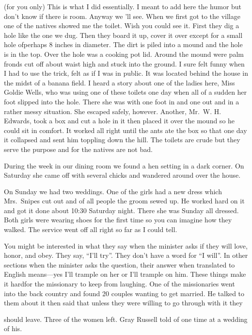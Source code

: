 \documentclass[
]{book}
\begin{document}
(for you only) This is what I did essentially. I meant to add here the humor but don't know if there is room. Anyway we 'll see. When we first got to the village one of the natives showed me the toilet. Wish you could see it. First they dig a hole like the one we dug. Then they board it up, cover it over except for a small hole ofperhaps 8 inches in diameter. The dirt is piled into a mound and the hole is in the top. Over the hole was a cooking pot lid. Around the mound were palm fronds cut off about waist high and stuck into the ground. I sure felt funny when I had to use the trick, felt as if I was in public. It was located behind the house in the midst of a banana field. I heard a story about one of the ladies here, Miss Goldie Wells, who was using one of these toilets one day when all of a sudden her foot slipped into the hole. There she was with one foot in and one out and in a rather messy situation. She escaped safely, however. Another, Mr.~W. H. Edwards, took a box and cut a hole in it then placed it over the mound so he could sit in comfort. It worked all right until the ants ate the box so that one day it collapsed and sent him toppling down the hill. The toilets are crude but they serve the purpose and for the natives are not bad.

During the week in our dining room we found a hen setting in a dark corner. On Saturday she came off with several chicks and wandered around over the house.

On Sunday we had two weddings. One of the girls had a new dress which Mrs.~Snipes cut out and of all people the groom sewed up. He worked hard on it and got it done about 10:30 Saturday night. There she was Sunday all dressed. Both girls were wearing shoes for the first time so you can imagine how they walked. The service went off all right so far as I could tell.

You might be interested in what they say when the minister asks if they will love, honor, and obey. They say, ``I'll try''. They don't have a word for ``I will''. In other sections when the minister asks the question, their answer when translated to English means---yes I'll trample on her or I'll trample on him. These things make it hardfor the missionary to keep from laughing. One of the missionaries went into the back country and found 20 couples wanting to get married. He talked to them about it then said that unless they were willing to go through with it they

should leave. Three of the women left. Gray Russell told of one time at a wedding of his.
\end{document}
